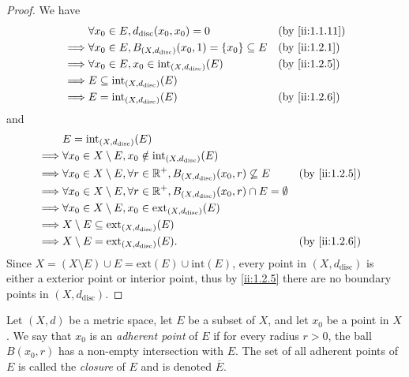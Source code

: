 \begin{proof}
  We have
  \begin{align*}
             & \forall x_0 \in E, d_{\text{disc}}(x_0, x_0) = 0                            &  & \by{ii:1.1.11} \\
    \implies & \forall x_0 \in E, B_{(X, d_{\text{disc}})}(x_0, 1) = \set{x_0} \subseteq E &  & \by{ii:1.2.1}  \\
    \implies & \forall x_0 \in E, x_0 \in \text{int}_{(X, d_{\text{disc}})}(E)             &  & \by{ii:1.2.5}  \\
    \implies & E \subseteq \text{int}_{(X, d_{\text{disc}})}(E)                                                \\
    \implies & E = \text{int}_{(X, d_{\text{disc}})}(E)                                    &  & \by{ii:1.2.6}
  \end{align*}
  and
  \begin{align*}
             & E = \text{int}_{(X, d_{\text{disc}})}(E)                                                                                  \\
    \implies & \forall x_0 \in X \setminus E, x_0 \notin \text{int}_{(X, d_{\text{disc}})}(E)                                            \\
    \implies & \forall x_0 \in X \setminus E, \forall r \in \R^+, B_{(X, d_{\text{disc}})}(x_0, r) \not\subseteq E    &  & \by{ii:1.2.5} \\
    \implies & \forall x_0 \in X \setminus E, \forall r \in \R^+, B_{(X, d_{\text{disc}})}(x_0, r) \cap E = \emptyset                    \\
    \implies & \forall x_0 \in X \setminus E, x_0 \in \text{ext}_{(X, d_{\text{disc}})}(E)                                               \\
    \implies & X \setminus E \subseteq \text{ext}_{(X, d_{\text{disc}})}(E)                                                              \\
    \implies & X \setminus E = \text{ext}_{(X, d_{\text{disc}})}(E).                                                  &  & \by{ii:1.2.6}
  \end{align*}
  Since \(X = (X \setminus E) \cup E = \text{ext}(E) \cup \text{int}(E)\), every point in \((X, d_{\text{disc}})\) is either a exterior point or interior point, thus by \cref{ii:1.2.5} there are no boundary points in \((X, d_{\text{disc}})\).
\end{proof}

\begin{defn}[Closure]\label{ii:1.2.9}
  Let \((X, d)\) be a metric space, let \(E\) be a subset of \(X\), and let \(x_0\) be a point in \(X\).
  We say that \(x_0\) is an \emph{adherent point} of \(E\) if for every radius \(r > 0\), the ball \(B(x_0, r)\) has a non-empty intersection with \(E\).
  The set of all adherent points of \(E\) is called the \emph{closure} of \(E\) and is denoted \(\overline{E}\).
\end{defn}

